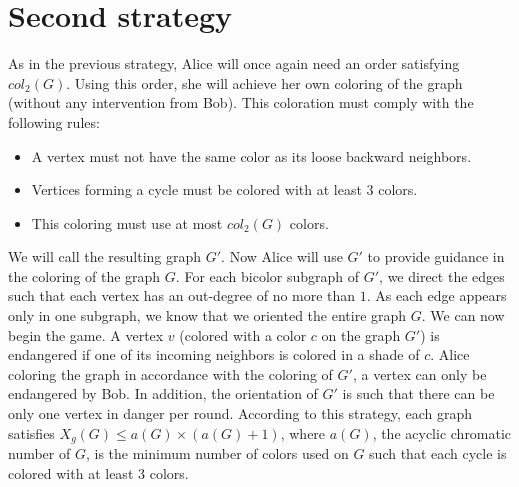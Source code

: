 \section{Second strategy}

As in the previous strategy, Alice will once again need an order satisfying $col_{2}(G)$.
Using this order, she will achieve her own coloring of the graph (without any intervention from Bob).
This coloration must comply with the following rules:
\begin{itemize}
\item A vertex must not have the same color as its loose backward neighbors.
\item Vertices forming a cycle must be colored with at least 3 colors.
\item This coloring must use at most $col_{2}(G)$ colors.
\end{itemize}

We will call the resulting graph $G'$.
Now Alice will use $G'$ to provide guidance in the coloring of the graph $G$. For each bicolor subgraph of $G'$,
we direct the edges such that each vertex has an out-degree of no more than $1$. As each edge appears only in
one subgraph, we know that we oriented the entire graph $G$. We can now begin the game. 
A vertex $v$ (colored with a color $c$ on the graph $G'$) is endangered if one of its incoming neighbors is colored in a shade of $c$. Alice coloring the graph in accordance with the coloring of $G'$, a vertex can only be endangered by Bob. In addition, the orientation of $G'$ is such that there can be only one vertex in danger per round.
According to this strategy, each graph satisfies $X_{g}(G) \leq a(G) \times (a(G) + 1)$, where $a(G)$, the acyclic chromatic number of $G$, is the minimum number of colors used on $G$ such that each cycle is colored with at least $3$ colors.